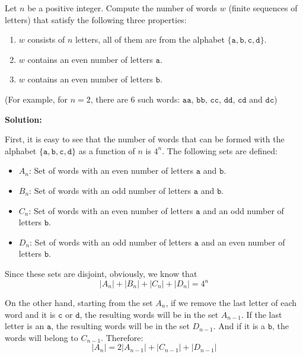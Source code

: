 \documentclass[../../main.tex]{subfiles}
\begin{document}
  \begin{shaded}
    Let $n$ be a positive integer. Compute the number of words $w$ (finite sequences of letters) that satisfy the following three properties:

    \begin{enumerate}
      \item $w$ consists of $n$ letters, all of them are from the alphabet $\{\mathtt{a}, \mathtt{b}, \mathtt{c}, \mathtt{d}\}$.
      \item $w$ contains an even number of letters $\mathtt{a}$.
      \item $w$ contains an even number of letters $\mathtt{b}$.
    \end{enumerate}

    (For example, for $n = 2$, there are 6 such words: $\mathtt{aa}$, $\mathtt{bb}$, $\mathtt{cc}$, $\mathtt{dd}$, $\mathtt{cd}$ and $\mathtt{dc}$)
  \end{shaded}

  \textbf{Solution:}

  First, it is easy to see that the number of words that can be formed with the alphabet $\{\mathtt{a}, \mathtt{b}, \mathtt{c}, \mathtt{d}\}$ as a function of $n$ is $4^n$. The following sets are defined:

  \begin{itemize}
    \item $A_n$: Set of words with an even number of letters $\mathtt{a}$ and $\mathtt{b}$.
    \item $B_n$: Set of words with an odd number of letters $\mathtt{a}$ and $\mathtt{b}$.
    \item $C_n$: Set of words with an even number of letters $\mathtt{a}$ and an odd number of letters $\mathtt{b}$.
    \item $D_n$: Set of words with an odd number of letters $\mathtt{a}$ and an even number of letters $\mathtt{b}$.
  \end{itemize}

  Since these sets are disjoint, obviously, we know that
  $$
  |A_n| + |B_n| + |C_n| + |D_n| = 4^n
  $$

  On the other hand, starting from the set $A_n$, if we remove the last letter of each word and it is $\mathtt{c}$ or $\mathtt{d}$, the resulting words will be in the set $A_{n - 1}$. If the last letter is an $\mathtt{a}$, the resulting words will be in the set $D_{n - 1}$. And if it is a $\mathtt{b}$, the words will belong to $C_{n - 1}$. Therefore:
  $$
  |A_n| = 2 |A_{n - 1}| + |C_{n - 1}| + |D_{n - 1}|
  $$
\end{document}
